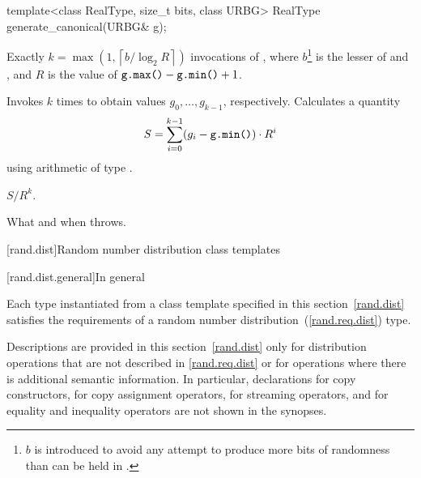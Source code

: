 %
\begin{itemdecl}
template<class RealType, size_t bits, class URBG>
 RealType generate_canonical(URBG& g);
\end{itemdecl}

\begin{itemdescr}
\pnum\complexity Exactly
 $ k = \max(1, \left\lceil b / \log_2 R \right\rceil)$
 invocations
 of ,
 where $b$\footnote{$b$ is introduced
   to avoid any attempt
   to produce more bits of randomness
   than can be held in .}
   is the lesser of 
                and ,
 and
   $R$ is the value of $ \texttt{\protect g.max()} - \texttt{\protect g.min()} + 1 $.

\pnum\effects
 Invokes  $k$ times
 to obtain values $ g_0, \ldots, g_{k-1} $, respectively.
 Calculates a quantity
 \[
   S = \sum_{i=0}^{k-1} (g_i - \texttt{\protect g.min()})
                        \cdot R^i
 \]
 using arithmetic of type
 .

\pnum\returns
 $ S / R^k $.

\pnum\throws What and when  throws.
\end{itemdescr}%




[rand.dist]{Random number distribution class templates}%

[rand.dist.general]{In general}

\pnum
Each type instantiated
from a class template specified in this section~\ref{rand.dist}
satisfies the requirements
of a random number distribution~(\ref{rand.req.dist}) type.

\pnum
Descriptions are provided in this section~\ref{rand.dist}
only for distribution operations
that are not described in \ref{rand.req.dist}
or for operations where there is additional semantic information.
In particular,
declarations for copy constructors,
for copy assignment operators,
for streaming operators,
and for equality and inequality operators
are not shown in the synopses.

